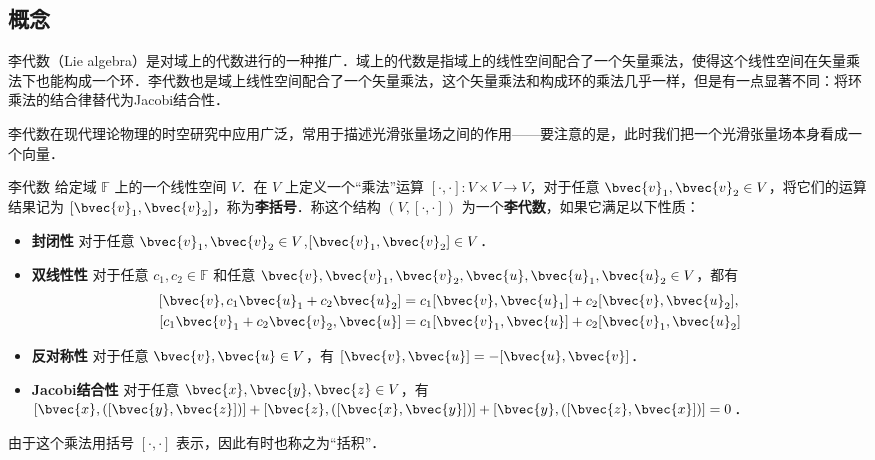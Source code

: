 

\subsection{概念}

李代数（Lie algebra）是对域上的代数进行的一种推广．域上的代数是指域上的线性空间配合了一个矢量乘法，使得这个线性空间在矢量乘法下也能构成一个环．李代数也是域上线性空间配合了一个矢量乘法，这个矢量乘法和构成环的乘法几乎一样，但是有一点显著不同：将环乘法的结合律替代为Jacobi结合性．

李代数在现代理论物理的时空研究中应用广泛，常用于描述光滑张量场之间的作用——要注意的是，此时我们把一个光滑张量场本身看成一个向量．

\begin{definition}{李代数}
给定域 $\mathbb{F}$ 上的一个线性空间 $V$．在 $V$ 上定义一个“乘法”运算 $[\cdot, \cdot] : V \times V \to V$，对于任意 $\bvec{v}_1, \bvec{v}_2\in V$，将它们的运算结果记为 $[\bvec{v}_1, \bvec{v}_2]$，称为\textbf{李括号}．称这个结构 $(V, [\cdot, \cdot])$ 为一个\textbf{李代数}，如果它满足以下性质：

\begin{itemize}
\item \textbf{封闭性} 对于任意 $\bvec{v}_1, \bvec{v}_2\in V$,$[\bvec{v}_1, \bvec{v}_2]\in V$．%

\item \textbf{双线性性} 对于任意 $c_1, c_2 \in \mathbb{F}$ 和任意 $\bvec{v}, \bvec{v}_1, \bvec{v}_2, \bvec{u}, \bvec{u}_1, \bvec{u}_2 \in V$，都有 
$$\begin{aligned}
{[\bvec{v}, c_1\bvec{u}_1 + c_2\bvec{u}_2]} &= c_1 [\bvec{v}, \bvec{u}_1] + c_2[\bvec{v}, \bvec{u}_2], \\
[c_1\bvec{v}_1+c_2\bvec{v}_2, \bvec{u}] &= c_1[\bvec{v}_1, \bvec{u}] + c_2[\bvec{v}_1, \bvec{u}_2]
\end{aligned}$$

\item \textbf{反对称性} 对于任意 $\bvec{v}, \bvec{u}\in V$，有 $[\bvec{v}, \bvec{u}]=-[\bvec{u}, \bvec{v}]$．

\item \textbf{Jacobi结合性} 对于任意 $\bvec{x}, \bvec{y}, \bvec{z}\in V$，有 $[\bvec{x}, ([\bvec{y}, \bvec{z}])]+[\bvec{z}, ([\bvec{x}, \bvec{y}])]+[\bvec{y}, ([\bvec{z}, \bvec{x}])]=0$．
\end{itemize}

由于这个乘法用括号 $[\cdot, \cdot]$ 表示，因此有时也称之为“括积”．
\end{definition}


